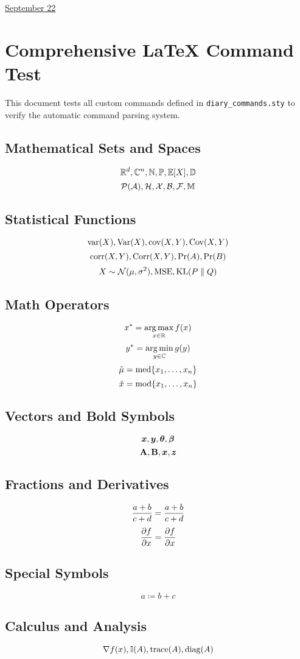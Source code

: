 \documentclass[11pt,letterpaper]{article}
\begin{document}
\href{run:2025-09-22-command-test.tex}{\Huge September 22} 

\section{Comprehensive LaTeX Command Test}

This document tests all custom commands defined in \verb|diary_commands.sty| to verify the automatic command parsing system.

\subsection{Mathematical Sets and Spaces}
$$\mathbb{R}^d, \mathbb{C}^n, \mathbb{N}, \mathbb{P}, \mathbb{E}[X], \mathbb{D}$$
$$\mathcal{P}(\mathcal{A}), \mathcal{H}, \mathcal{X}, \mathcal{B}, \mathcal{F}, \mathbb{M}$$

\subsection{Statistical Functions}
$$\mathrm{var}(X), \mathrm{Var}(X), \mathrm{cov}(X,Y), \mathrm{Cov}(X,Y)$$
$$\mathrm{corr}(X,Y), \mathrm{Corr}(X,Y), \mathrm{Pr}(A), \mathrm{Pr}(B)$$
$$X \sim \mathcal{N}(\mu, \sigma^2), \mathrm{MSE}, \mathrm{KL}(P \parallel Q)$$

\subsection{Math Operators}
$$x^* = \operatorname*{arg\,max}_{x \in \mathbb{R}} f(x)$$
$$y^* = \operatorname*{arg\,min}_{y \in \mathbb{C}} g(y)$$
$$\hat{\mu} = \operatorname*{\mathrm{med}}\{x_1, \ldots, x_n\}$$
$$\hat{x} = \operatorname*{\mathrm{mod}}\{x_1, \ldots, x_n\}$$

\subsection{Vectors and Bold Symbols}
$$\boldsymbol{x}, \boldsymbol{y}, \boldsymbol{\theta}, \boldsymbol{\beta}$$
$$\mathbf{A}, \mathbf{B}, \boldsymbol{x}, \mbox{\boldmath$z$}$$

\subsection{Fractions and Derivatives}
$$\frac{\displaystyle a + b}{\displaystyle c + d} = \frac{\displaystyle a + b}{\displaystyle c + d}$$
$$\frac{\displaystyle \partial f}{\displaystyle \partial x} = \frac{\displaystyle \partial f}{\displaystyle \partial x}$$

\subsection{Special Symbols}
$$a \coloneq b + c$$

\subsection{Calculus and Analysis}
$$\nabla f(x), \mathbb{I}(A), \mathrm{trace}(A), \mathrm{diag}(A)$$
\end{document}
